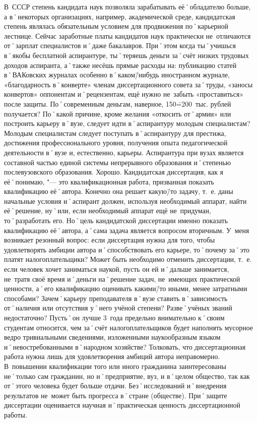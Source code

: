 \begin{drama}
	\maxspeaks В~СССР степень кандидата наук позволяла зарабатывать её˚обладателю больше, а в˚некоторых организациях, например, академической среде, кандидатская степень являлась обязательным условием для продвижения по˚карьерной лестнице. Сейчас заработные платы кандидатов наук практически не~отличаются от˚зарплат специалистов и˚даже бакалавров. При˚этом когда ты˚учишься в˚якобы бесплатной аспирантуре, ты˚теряешь деньги за˚счёт низких трудовых доходов аспиранта, а˚также несёшь прямые расходы на: публикацию статей в˚ВАКовских журналах особенно в˚каком\=/нибудь иностранном журнале,  «благодарность в˚конверте» членам диссертационного совета за˚труды,  «заносы конвертов» оппонентам и˚рецензентам, ещё нужно не~забыть  «проставиться» после защиты. По˚современным деньгам, наверное, 150\==200~тыс. рублей получается? По˚какой причине, кроме желания  «откосить от˚армии» или построить карьеру в˚вузе, следует идти в˚аспирантуру молодым специалистам?
	\michaelspeaks Молодым специалистам следует поступать в˚аспирантуру для престижа, достижения профессионального уровня, получения опыта педагогической деятельности в˚вузе и, естественно, карьеры. Аспирантура при вузах является составной частью единой системы непрерывного образования и˚степенью послевузовского образования.
	\maxspeaks Хорошо. Кандидатская диссертация, как я её˚понимаю, "--- это квалификационная работа, призванная показать квалификацию её˚автора. Конечно она решает какую\=/то задачу, т.~е. даны начальные условия и˚аспирант должен, используя необходимый аппарат, найти её˚решение, ну˚или, если необходимый аппарат ещё не~придуман, то˚разработать его. Но˚цель кандидатской диссертации именно показать квалификацию её˚автора, а˚сама задача является вопросом вторичным. У~меня возникает резонный вопрос: если диссертация нужна для того, чтобы удовлетворять амбиции автора и˚способствовать его карьере, то˚почему за˚это платят налогоплательщики? Может быть необходимо отменить диссертации, т.~е. если человек хочет заниматься наукой, пусть он ей и˚дальше занимается, не~тратя своё время и˚деньги на˚решение задач, не~имеющих практической ценности, а˚его квалификацию оценивать какими\=/то иными, менее затратными способами? Зачем˚карьеру преподавателя в˚вузе ставить в˚зависимость от˚наличия или отсутствия у˚него учёной степени? Разве˚учёных званий недостаточно? Пусть˚он лучше 3~года предельно внимательно к˚своим студентам относится, чем за˚счёт налогоплательщиков будет наполнять мусорное ведро тривиальными сведениями, изложенными наукообразным языком и˚невостребованными в˚народном хозяйстве?
	\michaelspeaks Толковать, что диссертационная работа нужна лишь для удовлетворения амбиций автора неправомерно. В~повышении квалификации того или иного гражданина заинтересованы не˚только сам гражданин, но и˚предприятие, вуз, и в˚целом общество, так как от˚этого человека будет больше отдачи. Без˚исследований и˚внедрения результатов не~может быть прогресса в˚стране (обществе). При˚защите диссертации оценивается научная и˚практическая ценность диссертационной работы.

\end{drama}
